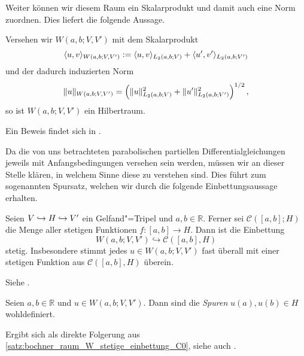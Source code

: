 \documentclass[../main.tex]{subfiles}
\begin{document}
Weiter können wir diesem Raum ein Skalarprodukt und damit auch eine Norm zuordnen.
Dies liefert die folgende Aussage.

\begin{Lemma}
\label{lemma:bochner_W_ist_hilbertraum}
    Versehen wir $W(a, b; V, V')$ mit dem Skalarprodukt
    \begin{equation}
        \langle u,v\rangle_{W(a, b; V, V')} := \langle u,v\rangle_{L_{2}(a, b; V)} + \langle u',v'\rangle_{L_{2}(a, b; V')}
    \end{equation}
    und der dadurch induzierten Norm
    \begin{equation}
        \lVert u\rVert_{W(a, b; V, V')} = \left( \lVert u\rVert_{L_{2}(a, b; V)}^{2} + \lVert u'\rVert_{L_{2}(a, b; V')}^{2} \right)^{1/2},
    \end{equation}
    so ist $W(a, b; V, V')$ ein Hilbertraum.

    \begin{Beweis}
        Ein Beweis findet sich in \cite[Proposition XVIII.2.6]{Dautray:1992by}.
    \end{Beweis}
\end{Lemma}

Da die von uns betrachteten parabolischen partiellen Differentialgleichungen jeweils mit Anfangsbedingungen versehen sein werden, müssen wir an dieser Stelle klären, in welchem Sinne diese zu verstehen sind.
Dies führt zum sogenannten Spursatz, welchen wir durch die folgende Einbettungsaussage erhalten.

\begin{Satz}
\label{satz:bochner_raum_W_stetige_einbettung_C0}
    Seien $V \hookrightarrow H \hookrightarrow V'$ ein Gelfand"=Tripel und $a, b \in \mathbb{R}$.
    Ferner sei $\mathcal C([a, b]; H)$ die Menge aller stetigen Funktionen $f \colon [a, b] \to H$.
    Dann ist die Einbettung
    \begin{equation}
        W(a, b; V, V') \hookrightarrow \mathcal C([a, b], H)
    \end{equation}
    stetig.
    Insbesondere stimmt jedes $u \in W(a, b; V, V')$ fast überall mit einer stetigen Funktion aus $\mathcal C([a, b], H)$ überein.

    \begin{Beweis}
        Siehe \cites[Theorem XVIII.2.1]{Dautray:1992by}[Theorem 10.9]{Schweizer2013}.
    \end{Beweis}
\end{Satz}

\begin{Korollar}[Spursatz]
\label{korollar:spursatz}
    Seien $a, b \in \mathbb{R}$ und $u \in W(a, b; V, V')$.
    Dann sind die \emph{Spuren} $u(a), u(b) \in H$ wohldefiniert.

    \begin{Beweis}
        Ergibt sich als direkte Folgerung aus \cref{satz:bochner_raum_W_stetige_einbettung_C0}, siehe auch \cite[Remark XVIII.2.4]{Dautray:1992by}.
    \end{Beweis}
\end{Korollar}
\end{document}

